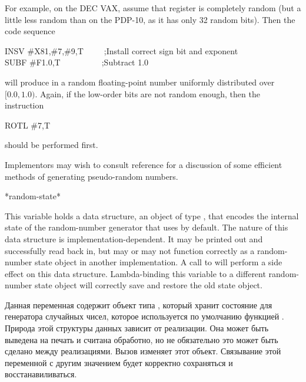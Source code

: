 \begin{defun}[Function]
\begin{implementation}
For example, on the DEC VAX, assume that register  is
completely random (but a little less random than on the PDP-10, as
it has only 32 random bits).  Then the code sequence
\begin{lisp}
INSV \#{\Xcircumflex}X81,\#7,\#9,T~~~~~;\textrm{Install correct sign bit and exponent} \\
SUBF \#{\Xcircumflex}F1.0,T~~~~~~~~~~;\textrm{Subtract 1.0}
\end{lisp}
will produce in  a random floating-point number uniformly distributed
over $[0.0, 1.0)$.  Again, if the low-order bits are not random enough,
then the instruction
\begin{lisp}
ROTL \#7,T
\end{lisp}
should be performed first.

Implementors may wish to consult reference \cite{ADDITIVE-RANDOMS} for
a discussion of some efficient methods of generating pseudo-random numbers.
\end{implementation}
\afternoterule
\end{defun}

\begin{defun}[Variable]
*random-state*

This variable holds a data structure,
an object of type , that encodes the internal state
of the random-number generator that  uses by default.
The nature
of this data structure is implementation-dependent.  It may be
printed out and successfully read back in, but may or may not function
correctly as a random-number state object in another implementation.
A call to  will perform a side effect on this data structure.
Lambda-binding this variable to a different random-number state object
will correctly save and restore the old state object.

Данная переменная содержит объект типа , который хранит
состояние для генератора случайных чисел, которое используется по умолчанию
функцией .
Природа этой структуры данных зависит от реализации. Она может быть выведена на
печать и считана обработно, но не обязательно это может быть сделано между
реализациями.
Вызов  изменяет этот объект.
Связывание этой переменной с другим значением будет корректно сохраняться и
восстанавиливаться.
\end{defun}

